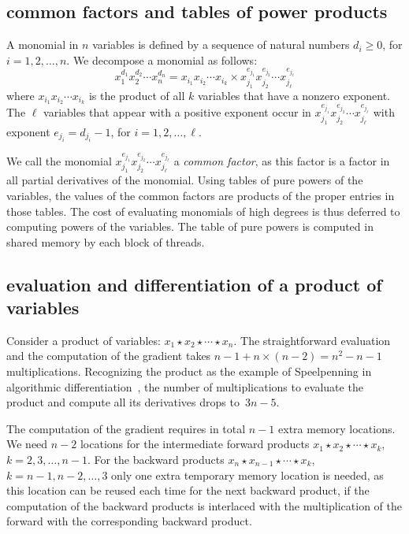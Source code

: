 \documentclass{article}
\begin{document}
\subsection{common factors and tables of power products}
A monomial in $n$ variables is defined by a sequence of 
natural numbers $d_i \geq 0$, for $i = 1,2,\ldots,n$.
We decompose a monomial as follows:
\begin{equation}
   x_1^{d_1} x_2^{d_2} \cdots x_n^{d_n}
   = x_{i_1} x_{i_2} \cdots x_{i_k}
   \times
   x_{j_1}^{e_{j_1}} x_{j_2}^{e_{j_2}} \cdots x_{j_\ell}^{e_{j_\ell}}
\end{equation}
where $x_{i_1} x_{i_2} \cdots x_{i_k}$ is the product of all $k$
variables that have a nonzero exponent.
The $\ell$ variables that appear with a positive exponent
occur in
$x_{j_1}^{e_{j_1}} x_{j_2}^{e_{j_2}} \cdots x_{j_\ell}^{e_{j_\ell}}$
with exponent $e_{j_i} = d_{j_i} - 1$, for $i = 1,2,\ldots, \ell$.

We call the monomial
$x_{j_1}^{e_{j_1}} x_{j_2}^{e_{j_2}} \cdots x_{j_\ell}^{e_{j_\ell}}$
a {\em common factor}, as this factor is a factor in all partial
derivatives of the monomial.
Using tables of pure powers of the variables, the values of the 
common factors are products of the proper entries in those tables.
The cost of evaluating monomials of high degrees is thus deferred
to computing powers of the variables.
The table of pure powers is computed in shared memory 
by each block of threads.

\subsection{evaluation and differentiation of a product of variables}
Consider a product of variables: $x_1 \star x_2 \star \cdots \star x_n$.
The straightforward evaluation and the computation of the gradient
takes $n-1 + n \times (n-2) = n^2 - n - 1$ multiplications.
Recognizing the product as the example of Speelpenning in algorithmic
differentiation~\cite{GW08}, 
the number of multiplications to evaluate the product
and compute all its derivatives drops to~$3n-5$.

The computation of the gradient requires in total $n-1$ 
extra memory locations.  We need $n-2$ locations for the intermediate 
forward products $x_1 \star x_2 \star \cdots \star x_k$, 
$k=2, 3, \ldots, n-1$.
For the backward products $x_n \star x_{n-1} \star \cdots \star x_k$, 
$k = n-1, n-2, \ldots, 3$ only one extra temporary memory location
is needed, as this location can be reused each time for the next
backward product, if the computation of the backward products is
interlaced with the multiplication of the forward with the 
corresponding backward product.
\end{document}
